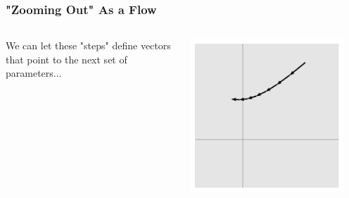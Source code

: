 \documentclass[aspectratio=169, 12pt]{beamer}
\begin{document}
\begin{frame}

    \frametitle{"Zooming Out" As a Flow}

    \begin{columns}
    \begin{column}{.6\textwidth}
    
        We can let these "steps" define vectors that point to the next set of parameters...
        
    \end{column}
    \begin{column}{.4\textwidth}
        \includegraphics[width=0.9\textwidth]{images/vector-steps.png}
    \end{column}
    \end{columns}
    
\end{frame}
\end{document}
